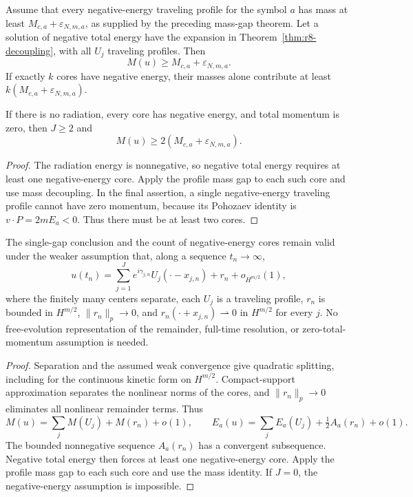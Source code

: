 \begin{proposition}\label{prop:r8-asymptotic-gap}
Assume that every negative-energy traveling profile for the symbol $a$ has mass at least $M_{c,a}+\varepsilon_{N,m,a}$, as supplied by the preceding mass-gap theorem. Let a solution of negative total energy have the expansion in Theorem~\ref{thm:r8-decoupling}, with all $U_j$ traveling profiles. Then
\[
 M(u)\ge M_{c,a}+\varepsilon_{N,m,a}.
\]
If exactly $k$ cores have negative energy, their masses alone contribute at least $k(M_{c,a}+\varepsilon_{N,m,a})$.

If there is no radiation, every core has negative energy, and total momentum is zero, then $J\ge2$ and
\[
 M(u)\ge2(M_{c,a}+\varepsilon_{N,m,a}).
\]
\end{proposition}

\begin{proof}
The radiation energy is nonnegative, so negative total energy requires at least one negative-energy core. Apply the profile mass gap to each such core and use mass decoupling. In the final assertion, a single negative-energy traveling profile cannot have zero momentum, because its Pohozaev identity is $v\cdot P=2m E_a<0$. Thus there must be at least two cores.
\end{proof}

\begin{proposition}\label{prop:r8-sequential-gap}
The single-gap conclusion and the count of negative-energy cores remain valid under the weaker assumption that, along a sequence $t_n\to\infty$,
\[
 u(t_n)=\sum_{j=1}^{J}e^{i\gamma_{j,n}}U_j(\cdot-x_{j,n})
          +r_n+o_{H^{m/2}}(1),
\]
where the finitely many centers separate, each $U_j$ is a traveling profile, $r_n$ is bounded in $H^{m/2}$,
$\|r_n\|_p\to0$, and $r_n(\cdot+x_{j,n})\rightharpoonup0$ in $H^{m/2}$ for every $j$. No free-evolution representation of the remainder, full-time resolution, or zero-total-momentum assumption is needed.
\end{proposition}

\begin{proof}
Separation and the assumed weak convergence give quadratic splitting, including for the continuous kinetic form on $H^{m/2}$. Compact-support approximation separates the nonlinear norms of the cores, and $\|r_n\|_p\to0$ eliminates all nonlinear remainder terms. Thus
\[
 M(u)=\sum_jM(U_j)+M(r_n)+o(1),\qquad
 E_a(u)=\sum_jE_a(U_j)+\tfrac12 A_a(r_n)+o(1).
\]
The bounded nonnegative sequence $A_a(r_n)$ has a convergent subsequence. Negative total energy then forces at least one negative-energy core. Apply the profile mass gap to each such core and use the mass identity. If $J=0$, the negative-energy assumption is impossible.
\end{proof}

